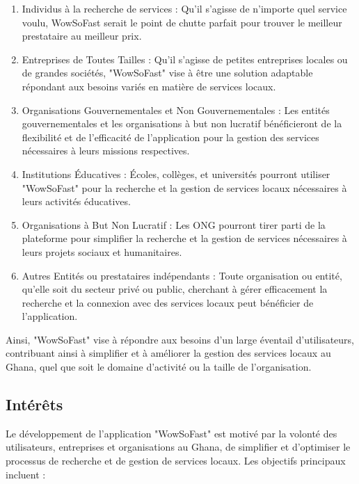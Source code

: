 \begin{enumerate}

    \item Individus à la recherche de services : Qu'il s'agisse de n'importe quel service voulu, WowSoFast serait le point de chutte parfait pour trouver le meilleur prestataire au meilleur prix.

    \item Entreprises de Toutes Tailles : Qu'il s'agisse de petites entreprises locales ou de grandes sociétés, "WowSoFast" vise à être une solution adaptable répondant aux besoins variés en matière de services locaux.

    \item Organisations Gouvernementales et Non Gouvernementales : Les entités gouvernementales et les organisations à but non lucratif bénéficieront de la flexibilité et de l'efficacité de l'application pour la gestion des services nécessaires à leurs missions respectives.

    \item Institutions Éducatives : Écoles, collèges, et universités pourront utiliser "WowSoFast" pour la recherche et la gestion de services locaux nécessaires à leurs activités éducatives.

    \item Organisations à But Non Lucratif : Les ONG pourront tirer parti de la plateforme pour simplifier la recherche et la gestion de services nécessaires à leurs projets sociaux et humanitaires.

    \item Autres Entités ou prestataires indépendants : Toute organisation ou entité, qu'elle soit du secteur privé ou public, cherchant à gérer efficacement la recherche et la connexion avec des services locaux peut bénéficier de l'application.
    
\end{enumerate}

Ainsi, "WowSoFast" vise à répondre aux besoins d'un large éventail d'utilisateurs, contribuant ainsi à simplifier et à améliorer la gestion des services locaux au Ghana, quel que soit le domaine d'activité ou la taille de l'organisation.


\subsection{Intérêts}

Le développement de l'application "WowSoFast" est motivé par la volonté des utilisateurs, entreprises et organisations au Ghana, de simplifier et d'optimiser le processus de recherche et de gestion de services locaux. Les objectifs principaux incluent :

